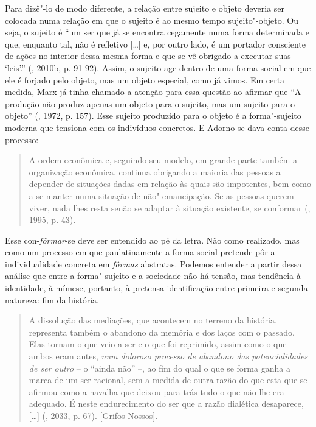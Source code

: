 Para dizê"-lo de modo diferente, a relação entre sujeito e objeto deveria ser
colocada numa relação em que o sujeito é ao mesmo tempo sujeito"-objeto.
Ou seja, o sujeito é ``um ser que já se encontra cegamente numa forma
determinada e que, enquanto tal, não é refletivo [\ldots{}] e, por outro
lado, é um portador consciente de ações no interior dessa mesma forma e
que se vê obrigado a executar suas `leis'.'' (, 2010b, p. 91-92).
Assim, o sujeito age dentro de uma forma social em que ele é forjado
pelo objeto, mas um objeto especial, como já vimos. Em certa medida,
Marx já tinha chamado a atenção para essa questão ao afirmar que ``A
produção não produz apenas um objeto para o sujeito, mas um sujeito para
o objeto'' (, 1972, p. 157). Esse sujeito produzido para o objeto é
a forma"-sujeito moderna que tensiona com os indivíduos concretos. E
Adorno se dava conta desse processo:

\begin{quote}
A ordem econômica e, seguindo seu modelo, em grande parte também a
organização econômica, continua obrigando a maioria das pessoas a
depender de situações dadas em relação às quais são impotentes, bem como
a se manter numa situação de não"-emancipação. Se as pessoas querem
viver, nada lhes resta senão se adaptar à situação existente, se
conformar (, 1995, p. 43).
\end{quote}

Esse con-\emph{fôrmar}-se deve ser entendido ao pé da letra. Não como
realizado, mas como um processo em que paulatinamente a forma social
pretende pôr a individualidade concreta em \emph{fôrmas} abstratas.
Podemos entender a partir dessa análise que entre a forma"-sujeito e a
sociedade não há tensão, mas tendência à identidade, à mímese, portanto,
à pretensa identificação entre primeira e segunda natureza: fim da
história.

\begin{quote}
A dissolução das mediações, que acontecem no terreno da história,
representa também o abandono da memória e dos laços com o passado. Elas
tornam o que veio a ser e o que foi reprimido, assim como o que ambos
eram antes, \emph{num doloroso processo de abandono das potencialidades
de ser outro} -- o ``ainda não'' --, ao fim do qual o que se forma ganha
a marca de um ser racional, sem a medida de outra razão do que esta que
se afirmou como a navalha que deixou para trás tudo o que não lhe era
adequado. É neste endurecimento do ser que a razão dialética desaparece,
[\ldots{}] (, 2033, p. 67). [Grifos Nossos].
\end{quote}

